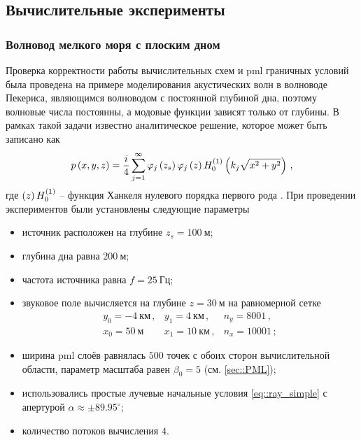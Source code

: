 \documentclass[../document.tex]{subfiles}
\begin{document}
        \subsection{Вычислительные эксперименты}
            \subsubsection{Волновод мелкого моря с плоским дном}
                \par Проверка корректности работы вычислительных схем и \acrshort{pml} граничных условий была проведена на примере моделирования акустических волн в волноводе Пекериса, являющимся волноводом с постоянной глубиной дна, поэтому волновые числа постоянны, а модовые функции зависят только от глубины. В рамках такой задачи известно аналитическое решение, которое может быть записано как \cite{jensen}
                \begin{equation}
                    p\left(x,y,z\right)=\frac{i}{4}\sum\limits_{j=1}^{\infty}\varphi_j\left(z_s\right)\varphi_j\left(z\right)H_0^{\left(1\right)}\left(k_j\sqrt{x^2+y^2}\right)\,,
                \end{equation}
                где $\left(z\right)H_0^{\left(1\right)}$ -- функция Ханкеля нулевого порядка первого рода \cite{hankel}. При проведении экспериментов были установлены следующие параметры 
                \begin{itemize}
                    \item источник расположен на глубине $z_s=100\ \text{м}$;
                    \item глубина дна равна $200\ \text{м}$;
                    \item частота источника равна $f=25\ \text{Гц}$;
                    \item звуковое поле вычисляется на глубине $z=30\ \text{м}$ на равномерной сетке
                    \begin{equation}
                        \begin{array}{lll}
                            y_0=-4\ \text{км}\,,&y_1=4\ \text{км}\,,&n_y=8001\,,\\
                            x_0=50\ \text{м}&x_1=10\ \text{км}\,,&n_x=10001\,;
                        \end{array}
                    \end{equation}
                    \item ширина \acrshort{pml} слоёв равнялась $500$ точек с обоих сторон вычислительной области, параметр масштаба равен $\beta_0=5$ (см. \ref{sec::PML});
                    \item использовались простые лучевые начальные условия \eqref{eq::ray_simple} с апертурой $\alpha\approx\pm 89.95^\circ$;
                    \item количество потоков вычисления $4$.
                \end{itemize}
\end{document}
